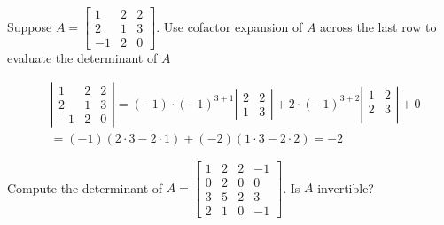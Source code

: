 \documentclass[a4paper,10pt]{article}
\begin{document}
\begin{problem}
Suppose $A=\begin{bmatrix}
1&2&2\\
2&1&3\\
-1&2&0
\end{bmatrix}$. Use cofactor expansion of $A$ across the last row to evaluate the determinant of $A$
\end{problem}

\begin{solution}
\begin{align*}
&\left|\begin{matrix}
1&2&2\\
2&1&3\\
-1&2&0
\end{matrix}\right|=(-1)\cdot(-1)^{3+1}\left|\begin{matrix}
2&2\\
1&3
\end{matrix}\right|+2\cdot(-1)^{3+2}\left|\begin{matrix}
1&2\\
2&3\\
\end{matrix}\right|+0\\
&=(-1)(2\cdot3-2\cdot1)+(-2)(1\cdot3-2\cdot2)=-2
\end{align*}
\end{solution}

\begin{problem}
Compute the determinant of $A=\begin{bmatrix}
1&2&2&-1\\
0&2&0&0\\
3&5&2&3\\
2&1&0&-1
\end{bmatrix}$. Is $A$ invertible?
\end{problem}
\end{document}
